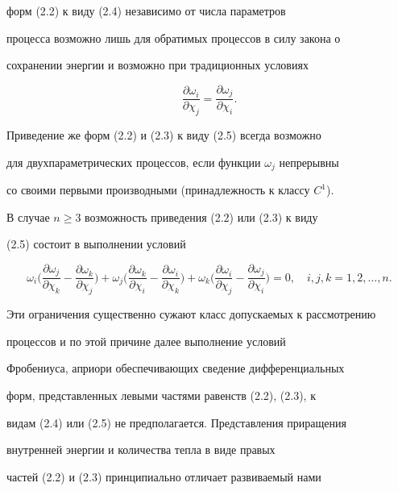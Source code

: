 форм (2.2) к виду (2.4) независимо от числа параметров


процесса возможно лишь для обратимых процессов в силу закона о


сохранении энергии и возможно при традиционных условиях


$$


\frac{\partial\omega_i}{\partial\chi_j}=


\frac{\partial\omega_j}{\partial\chi_i}.


$$


Приведение же форм (2.2) и (2.3) к виду (2.5) всегда возможно


для двухпараметрических процессов, если функции $\omega_j$ непрерывны


со своими первыми производными (принадлежность к классу $C^1$).





В случае $n\ge 3$ возможность приведения (2.2) или (2.3) к виду


(2.5) состоит в выполнении условий


$$


\omega_i\biggl(


\frac{\partial\omega_j}{\partial\chi_k}-


\frac{\partial\omega_k}{\partial\chi_j}\biggr)+\omega_j\biggl(


\frac{\partial\omega_k}{\partial\chi_i}-


\frac{\partial\omega_i}{\partial\chi_k}\biggr)+\omega_k\biggl(


\frac{\partial\omega_i}{\partial\chi_j}-


\frac{\partial\omega_j}{\partial\chi_i}\biggr)=0,\quad


i,j,k=1,2,\dotsc,n.


$$


Эти ограничения существенно сужают класс допускаемых к рассмотрению


процессов и по этой причине далее выполнение условий


Фробениуса, априори обеспечивающих сведение дифференциальных


форм, представленных левыми частями равенств (2.2), (2.3), к


видам (2.4) или (2.5) не предполагается. Представления приращения


внутренней энергии и количества тепла в виде правых


частей (2.2) и (2.3) принципиально отличает развиваемый нами


